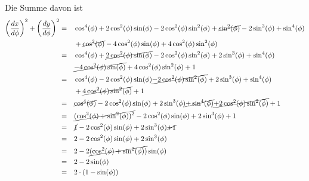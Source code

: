 \documentclass[a4paper,german,12pt,smallheadings]{scrartcl}
\begin{document}
\begin{enumerate}[a)]
    Die Summe davon ist
    \begin{align*}
      \left(\frac{dx}{d\phi}\right)^2 + \left(\frac{dy}{d\phi}\right)^2
      &= &&\cos^4(\phi) + 2\cos^2(\phi)\sin(\phi)-2\cos^2(\phi)\sin^2(\phi) + \cancel{\sin^2(\phi)}-2\sin^3(\phi)+\sin^4(\phi) \\
      &&&  + \cancel{\cos^2(\phi)}-4\cos^2(\phi)\sin(\phi)+4\cos^2(\phi)\sin^2(\phi) \\
      &= &&\cos^4(\phi) + \cancel{2\cos^2(\phi)\sin(\phi)}-2\cos^2(\phi)\sin^2(\phi) + 2\sin^3(\phi)+\sin^4(\phi) \\
      &&&  \cancel{-4\cos^2(\phi)\sin(\phi)}+4\cos^2(\phi)\sin^2(\phi)+1 \\
      &= &&\cos^4(\phi) - 2\cos^2(\phi)\sin(\phi)\cancel{-2\cos^2(\phi)\sin^2(\phi)} + 2\sin^3(\phi)+\sin^4(\phi) \\
      &&&  +\cancel{4\cos^2(\phi)\sin^2(\phi)}+1 \\
      &= &&\cancel{\cos^4(\phi)} - 2\cos^2(\phi)\sin(\phi) + 2\sin^3(\phi) \cancel{+\sin^4(\phi)} \cancel{+2\cos^2(\phi)\sin^2(\phi)}+1 \\
      &= &&\cancel{(\cos^2(\phi)+\sin^2(\phi))^2} - 2\cos^2(\phi)\sin(\phi) + 2\sin^3(\phi) +1 \\
      &= &&\cancel{1} - 2\cos^2(\phi)\sin(\phi) + 2\sin^3(\phi) \cancel{+1} \\
      &= &&2 - 2\cos^2(\phi)\sin(\phi) + 2\sin^3(\phi) \\
      &= &&2 - 2\cancel{(\cos^2(\phi) + \sin^2(\phi))}\sin(\phi) \\
      &= &&2 - 2\sin(\phi) \\
      &= &&2\cdot(1- \sin(\phi))
    \end{align*}


\end{enumerate}
\end{document}

